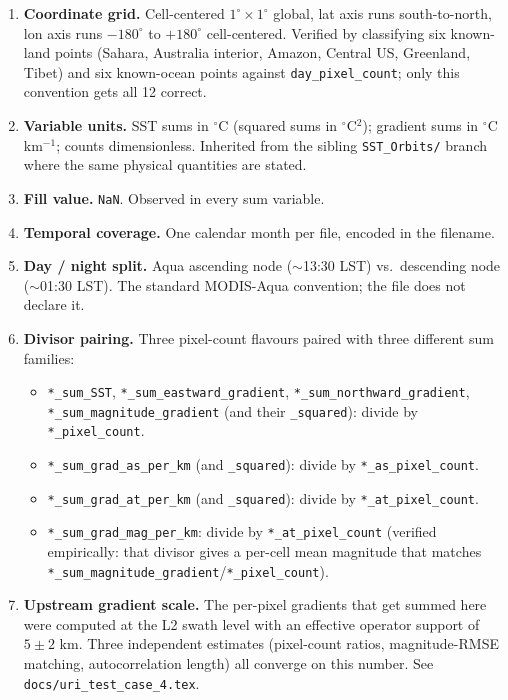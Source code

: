 \documentclass[11pt]{article}
\begin{document}
\begin{enumerate}[leftmargin=*,topsep=2pt]
  \item \textbf{Coordinate grid.}
    Cell-centered $1^\circ \times 1^\circ$ global, lat axis runs
    south-to-north, lon axis runs $-180^\circ$ to $+180^\circ$
    cell-centered. Verified by classifying six known-land points
    (Sahara, Australia interior, Amazon, Central US, Greenland,
    Tibet) and six known-ocean points against
    \texttt{day\_pixel\_count}; only this convention gets all 12
    correct.
  \item \textbf{Variable units.} SST sums in
    $^\circ$C (squared sums in $^\circ$C$^{2}$); gradient sums in
    $^\circ$C\,km$^{-1}$; counts dimensionless. Inherited from the
    sibling \texttt{SST\_Orbits/} branch where the same physical
    quantities are stated.
  \item \textbf{Fill value.} \texttt{NaN}. Observed in every sum
    variable.
  \item \textbf{Temporal coverage.} One calendar month per file,
    encoded in the filename.
  \item \textbf{Day / night split.} Aqua ascending node
    ($\sim$13:30 LST) vs.\ descending node ($\sim$01:30 LST). The
    standard MODIS-Aqua convention; the file does not declare it.
  \item \textbf{Divisor pairing.} Three pixel-count flavours
    paired with three different sum families:
    \begin{itemize}[topsep=0pt]
      \item \texttt{*\_sum\_SST}, \texttt{*\_sum\_eastward\_gradient},
        \texttt{*\_sum\_northward\_gradient},
        \texttt{*\_sum\_magnitude\_gradient} (and their
        \texttt{\_squared}): divide by \texttt{*\_pixel\_count}.
      \item \texttt{*\_sum\_grad\_as\_per\_km} (and
        \texttt{\_squared}): divide by \texttt{*\_as\_pixel\_count}.
      \item \texttt{*\_sum\_grad\_at\_per\_km} (and
        \texttt{\_squared}): divide by \texttt{*\_at\_pixel\_count}.
      \item \texttt{*\_sum\_grad\_mag\_per\_km}: divide by
        \texttt{*\_at\_pixel\_count} (verified empirically: that
        divisor gives a per-cell mean magnitude that matches
        \texttt{*\_sum\_magnitude\_gradient}/\texttt{*\_pixel\_count}).
    \end{itemize}
  \item \textbf{Upstream gradient scale.} The per-pixel gradients
    that get summed here were computed at the L2 swath level with
    an effective operator support of $5\pm 2$ km. Three
    independent estimates (pixel-count ratios, magnitude-RMSE
    matching, autocorrelation length) all converge on this
    number. See \texttt{docs/uri\_test\_case\_4.tex}.
\end{enumerate}
\end{document}
